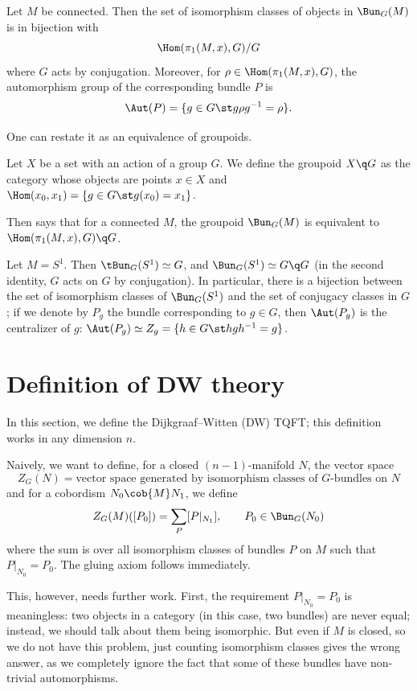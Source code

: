 \begin{lemma}\label{l:monodromy2}
  Let $M$ be connected. Then the set of isomorphism classes of objects
  in $\Bun_G(M)$ is in bijection with
  $$
    \Hom(\pi_1(M,x),G)/G
  $$
  where $G$ acts by conjugation. Moreover, for $\rho \in \Hom(\pi_1(M,x),G)$,
  the automorphism group of the corresponding bundle $P$ is
  \begin{equation}\label{e:aut-bundle-monodromy}
    \Aut(P) = \{g\in G\st g\rho g^{-1} = \rho\}.
  \end{equation}
\end{lemma}
One can restate it as an equivalence of groupoids.
\begin{definition}
  Let $X$ be a set with an action of a group $G$. We define the
  groupoid $X\q G$ as the category whose objects are points $x\in X$ and
  $\Hom(x_0, x_1)=\{g\in G\st g(x_0)=x_1\}$.
\end{definition}
Then  says that for a connected $M$, the groupoid
$\Bun_G(M)$ is equivalent to $\Hom(\pi_1(M,x),G)\q G$.


\begin{example}\label{x:bundles_s1}
  Let $M=S^1$. Then $\tBun_G(S^1)\simeq G$, and $\Bun_G(S^1)\simeq G\q G$ (in
  the second identity, $G$ acts on $G$ by conjugation). In particular, there is
  a bijection between the set of isomorphism classes of $\Bun_G(S^1)$ and the
  set of conjugacy classes in $G$; if we denote by $P_g$ the bundle
  corresponding to $g\in G$, then $\Aut(P_g)$ is the centralizer of $g$:
  $\Aut(P_g)\simeq Z_g=\{h\in G\st hgh^{-1}=g\}$.
\end{example}

\section{Definition of DW theory}\label{s:DW-definition}
In this section, we define the Dijkgraaf--Witten (DW) TQFT; this definition
works in any dimension $n$.

Naively, we want to define, for a closed $(n-1)$-manifold $N$, the vector space
$$
  Z_G(N)=\text{vector space generated by isomorphism classes of
    $G$-bundles on $N$}
$$
and for a cobordism $N_0\cob{M}N_1$, we define
$$
  Z_G(M)([P_0])=\sum_{P} [P|_{N_1}],\qquad P_0\in \Bun_G(N_0)
$$
where the sum is over all isomorphism classes of bundles $P$ on $M$ such that
$P|_{N_0}=P_0$. The gluing axiom follows immediately.

This, however, needs further work. First, the requirement $P|_{N_0}=P_0$
is meaningless: two objects in a category (in this case, two bundles) are never
equal; instead, we should talk about them being isomorphic. But even if $M$ is
closed, so we do not have this problem, just counting isomorphism classes gives
the wrong answer, as we completely ignore the fact that some of these bundles
have non-trivial automorphisms.

